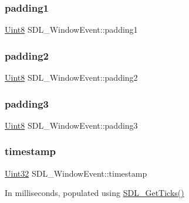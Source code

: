 \subsubsection{\texorpdfstring{padding1}{padding1}}
{\footnotesize\ttfamily \mbox{\hyperlink{_s_d_l__stdinc_8h_a2944638813a090aa23e62f4da842c3e2}{Uint8}} S\+D\+L\+\_\+\+Window\+Event\+::padding1}

\mbox{\label{struct_s_d_l___window_event_a6bcf773b690b894e8c04c591826d0c8a}} 
\subsubsection{\texorpdfstring{padding2}{padding2}}
{\footnotesize\ttfamily \mbox{\hyperlink{_s_d_l__stdinc_8h_a2944638813a090aa23e62f4da842c3e2}{Uint8}} S\+D\+L\+\_\+\+Window\+Event\+::padding2}

\mbox{\label{struct_s_d_l___window_event_ac352263b5fa4ba6dbd64a48062d5e29f}} 
\subsubsection{\texorpdfstring{padding3}{padding3}}
{\footnotesize\ttfamily \mbox{\hyperlink{_s_d_l__stdinc_8h_a2944638813a090aa23e62f4da842c3e2}{Uint8}} S\+D\+L\+\_\+\+Window\+Event\+::padding3}

\mbox{\label{struct_s_d_l___window_event_a7b0bf569b20cfa4e3fb76e3301d616f9}} 
\subsubsection{\texorpdfstring{timestamp}{timestamp}}
{\footnotesize\ttfamily \mbox{\hyperlink{_s_d_l__stdinc_8h_add440eff171ea5f55cb00c4a9ab8672d}{Uint32}} S\+D\+L\+\_\+\+Window\+Event\+::timestamp}

In milliseconds, populated using \mbox{\hyperlink{_s_d_l__timer_8h_a0b9bc71d6287e0ffafdc3419760fe2b3}{S\+D\+L\+\_\+\+Get\+Ticks()}} \mbox{\label{struct_s_d_l___window_event_a01c8c8fbe8564e690f958d2db560f657}} 
